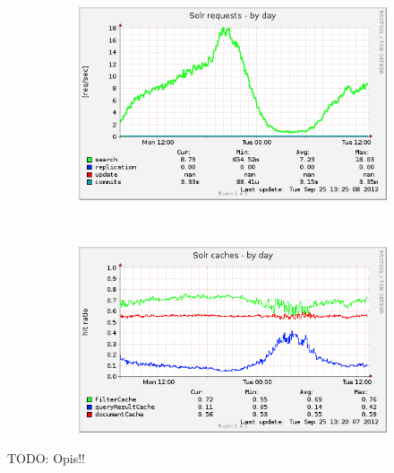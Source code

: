 \documentclass[10pt,a4paper]{article}
\newcommand{\todo}[1]{\noindent\colorbox{myRed}{TODO: #1}}
\begin{document}
\begin{figure}
        \centering
        \begin{subfigure}[b]{0.49\textwidth}
                \centering
                \includegraphics[width=\textwidth]{solr_users_reqs-day}
                \label{fig:solr_users_reqs-day}
        \end{subfigure}%
        ~ %
        \begin{subfigure}[b]{0.49\textwidth}
                \centering
                \includegraphics[width=\textwidth]{solr_users_cache-day}
                \label{fig:solr_users_cache-day}
        \end{subfigure}
        
        \label{fig:animals}
\end{figure}


\todo{Opis!!}
\end{document}
